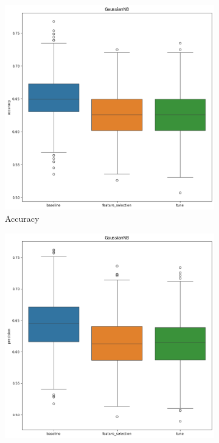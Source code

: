 \documentclass[12pt]{article}
\begin{document}
\begin{figure}[H]
    \centering
    \begin{subfigure}{0.31\textwidth}
        \centering
        \includegraphics[width=\linewidth]{ims/gnb_accuracy.png}
        \caption{Accuracy}
        \label{fig:gnb_acc}
    \end{subfigure}
    \begin{subfigure}{0.31\textwidth}
        \centering
        \includegraphics[width=\linewidth]{ims/gnb_precision.png}

\end{subfigure}
\end{figure}
\end{document}
